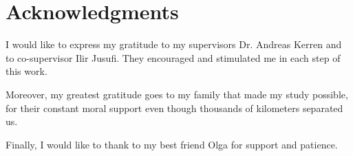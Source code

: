 \section*{Acknowledgments}
\label{sec:acknowledgments}

I would like to express my gratitude to my supervisors Dr. Andreas Kerren and to co-supervisor Ilir Jusufi. They encouraged and stimulated me in each step of this work.

Moreover, my greatest gratitude goes to my family that made my study possible, for their constant moral support even though thousands of kilometers separated us.

Finally, I would like to thank to my best friend Olga for support and patience.
